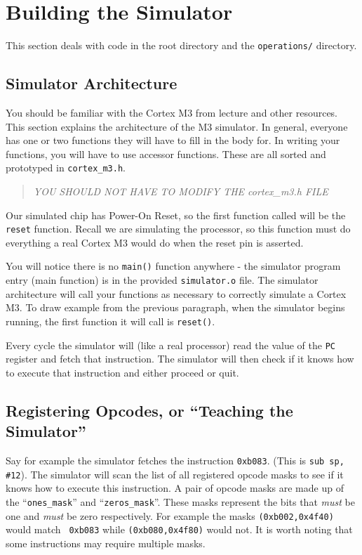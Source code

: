 \documentclass{article}
\begin{document}
\section{Building the Simulator}

This section deals with code in the root directory and the {\tt operations/}
directory.

\subsection{Simulator Architecture}

You should be familiar with the Cortex M3 from lecture and other resources.
This section explains the architecture of the M3 simulator. In general,
everyone has one or two functions they will have to fill in the body for. In
writing your functions, you will have to use accessor functions. These are all
sorted and prototyped in {\tt cortex\_m3.h}.

\begin{quote}
  \emph{YOU SHOULD NOT HAVE TO MODIFY THE cortex\_m3.h FILE}
\end{quote}

Our simulated chip has Power-On Reset, so the first function called will be
the {\tt reset} function. Recall we are simulating the processor, so this
function must do everything a real Cortex M3 would do when the reset pin is
asserted.

You will notice there is no {\tt main()} function anywhere - the simulator
program entry (main function) is in the provided {\tt simulator.o} file. The
simulator architecture will call your functions as necessary to correctly
simulate a Cortex M3. To draw example from the previous paragraph, when the
simulator begins running, the first function it will call is {\tt reset()}.

Every cycle the simulator will (like a real processor) read the value of the
{\tt PC} register and fetch that instruction. The simulator will then check if
it knows how to execute that instruction and either proceed or quit.

\subsection{Registering Opcodes, or ``Teaching the Simulator''}

Say for example the simulator fetches the instruction {\tt 0xb083}. (This is
{\tt sub sp, \#12}). The simulator will scan the list of all registered opcode
masks to see if it knows how to execute this instruction. A pair of opcode
masks are made up of the ``{\tt ones\_mask}'' and ``{\tt zeros\_mask}''. These
masks represent the bits that {\em must} be one and {\em must} be zero
respectively. For example the masks {\tt (0xb002,0x4f40)} would match {\tt
0xb083} while {\tt (0xb080,0x4f80)} would not. It is worth noting that some
instructions may require multiple masks.
\end{document}
